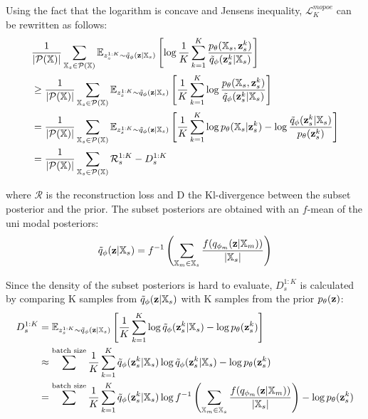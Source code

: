 Using the fact that the logarithm is concave and Jensens inequality, $\mathcal{L}^{mopoe}_K$ can be rewritten as follows:
\begin{equation}
    \begin{split}
        &\frac{1}{|\powerset|} \sum _{\xsubset \in \powerset} \mathbb{E}_{z^{1:K}_s \sim \subsetpost} \left[ \log \frac{1}{K} \sum _{k=1}^K \frac{p_{\theta}(\xsubset, \textbf{z}^k _s)}{\tilde{q}_{\phi}(\textbf{z}^k _s|\xsubset)} \right]\\
%
        &\geq \frac{1}{|\powerset|} \sum _{\xsubset \in \powerset} \mathbb{E}_{z^{1:K}_s \sim \subsetpost} \left[ \frac{1}{K} \sum _{k=1}^K \log  \frac{p_{\theta}(\xsubset, \textbf{z}^k _s)}{\tilde{q}_{\phi}(\textbf{z}^k _s|\xsubset)} \right]\\
%
        &= \frac{1}{|\powerset|} \sum _{\xsubset \in \powerset} \mathbb{E}_{z^{1:K}_s \sim \subsetpost} \left[ \frac{1}{K} \sum _{k=1}^K \log p_\theta (\xsubset|\textbf{z}^k _s) -\log  \frac{\tilde{q}_{\phi}(\textbf{z}^k _s|\xsubset)}{p_{\theta}(\textbf{z}^k _s)} \right]\\
%
        &= \frac{1}{|\powerset|} \sum _{\xsubset \in \powerset} \mathcal{R}^{1:K}_s - D^{1:K}_s
    \end{split}
\end{equation}

where $\mathcal{R}$ is the reconstruction loss and D the Kl-divergence between the subset posterior and the prior.
The subset posteriors are obtained with an $f$-mean of the uni modal posteriors:
\begin{equation}
    \tilde{q}_{\phi}(\textbf{z}|\mathbb{X}_s) = f^{-1}\left(\sum _{\mathbb{X}_m \in \mathbb{X}_s} \frac{f(q_{\phi_m}(\textbf{z}|\mathbb{X}_m))}{|\mathbb{X}_s|}\right)
\end{equation}

Since the density of the subset posteriors is hard to evaluate, $D^{1:K}_s$ is calculated by comparing K samples from $\tilde{q}_{\phi}(\textbf{z}|\mathbb{X}_s)$ with K samples from the prior $p_{\theta}(\textbf{z})$:
\begin{equation}
    \begin{split}
        D^{1:K}_s &=  \mathbb{E}_{z^{1:K}_s \sim \tilde{q}_{\phi}(\textbf{z}|\mathbb{X}_s)} \left[ \frac{1}{K} \sum _{k=1}^K \log \tilde{q}_{\phi}(\textbf{z}^k _s|\mathbb{X}_s) - \log p_{\theta}(\textbf{z}^k _s) \right]\\
        & \approx  \sum ^{\text{batch size}} \frac{1}{K} \sum _{k=1}^K \tilde{q}_{\phi}(\textbf{z}^k _s|\mathbb{X}_s) \log \tilde{q}_{\phi}(\textbf{z}^k _s|\mathbb{X}_s) - \log p_{\theta}(\textbf{z}^k _s)\\
        &= \sum ^{\text{batch size}} \frac{1}{K} \sum _{k=1}^K \tilde{q}_{\phi}(\textbf{z}^k _s|\mathbb{X}_s)  \log f^{-1}\left(\sum _{\mathbb{X}_m \in \mathbb{X}_s} \frac{f(q_{\phi_m}(\textbf{z}|\mathbb{X}_m))}{|\mathbb{X}_s|}\right) - \log p_{\theta}(\textbf{z}^k _s)
    \end{split}
\end{equation}



